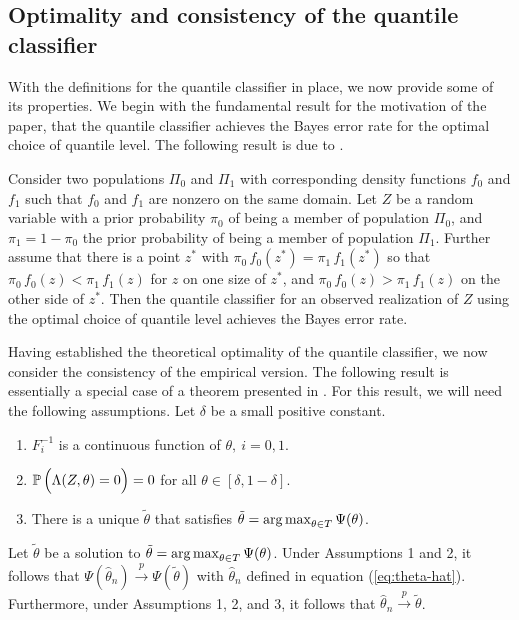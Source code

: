 \subsection{Optimality and consistency of the quantile classifier}
\label{sec:quantile-classifier-optimality}

With the definitions for the quantile classifier in place, we now provide some
of its properties.  We begin with the fundamental result for the motivation of
the paper, that the quantile classifier achieves the Bayes error rate for the
optimal choice of quantile level.  The following result is due to
\cite{hennig2016}.

\begin{lemma}
  \label{thm:quantile-classifier-is-bayes}
  Consider two populations $\Pi_0$ and $\Pi_1$ with corresponding density
  functions $f_0$ and $f_1$ such that $f_0$ and $f_1$ are nonzero on the same
  domain.  Let $Z$ be a random variable with a prior probability $\pi_0$ of
  being a member of population $\Pi_0$, and $\pi_1 = 1 - \pi_0$ the prior
  probability of being a member of population $\Pi_1$.  Further assume that
  there is a point $z^{*}$ with $\pi_0\, f_0(z^{*}) = \pi_1\, f_1(z^{*})$ so
  that $\pi_0\, f_0(z) < \pi_1\, f_1(z)$ for $z$ on one size of $z^{*}$, and
  $\pi_0\, f_0(z) > \pi_1\, f_1(z)$ on the other side of $z^{*}$.  Then the
  quantile classifier for an observed realization of $Z$ using the optimal
  choice of quantile level achieves the Bayes error rate.
\end{lemma}

Having established the theoretical optimality of the quantile classifier, we now
consider the consistency of the empirical version.  The following result is
essentially a special case of a theorem presented in \cite{hennig2016}.  For
this result, we will need the following assumptions.  Let $\delta$ be a small
positive constant.
\begin{enumerate}[label=\emph{Assumption \arabic*.}, align=left]
\item $F_i^{-1}$ is a continuous function of
  $\theta,~ i=0,1$.
\item $\mathbb{P}\,\Big( \Lambda(Z, \theta) = 0 \Big) = 0$ for all
  $\theta \in [\delta, 1 - \delta]$.
\item There is a unique $\tilde{\theta}$ that satisfies $\tilde{\theta} =
  \operatorname*{arg\,max}_{\theta \in T} \Psi(\theta)$.
\end{enumerate}

\begin{lemma}
  \label{lem:univariate-consistency}
  Let $\tilde{\theta}$ be a solution to
  $\tilde{\theta} = \operatorname*{arg\,max}_{\theta \in T} \Psi(\theta)$.  Under Assumptions 1
  and 2, it follows that
  $\Psi(\hat{\theta}_n) \stackrel{p}{\longrightarrow} \Psi(\tilde{\theta})$ with
  $\hat{\theta}_n$ defined in equation (\ref{eq:theta-hat}).  Furthermore, under
  Assumptions 1, 2, and 3, it follows that
  $\hat{\theta}_n \stackrel{p}{\longrightarrow} \tilde{\theta}$.
\end{lemma}

